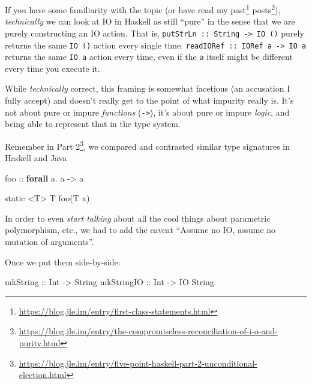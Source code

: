 \documentclass[]{article}
\newenvironment{Shaded}{}{}
\newcommand{\DataTypeTok}[1]{\textcolor[rgb]{0.56,0.13,0.00}{#1}}
\newcommand{\FunctionTok}[1]{\textcolor[rgb]{0.02,0.16,0.49}{#1}}
\newcommand{\KeywordTok}[1]{\textcolor[rgb]{0.00,0.44,0.13}{\textbf{#1}}}
\newcommand{\NormalTok}[1]{#1}
\newcommand{\OperatorTok}[1]{\textcolor[rgb]{0.40,0.40,0.40}{#1}}
\newcommand{\OtherTok}[1]{\textcolor[rgb]{0.00,0.44,0.13}{#1}}
\renewcommand{\href}[2]{#2\footnote{\url{#1}}}
\begin{document}
If you have some familiarity with the topic (or have read my
\href{https://blog.jle.im/entry/first-class-statements.html}{past}
\href{https://blog.jle.im/entry/the-compromiseless-reconciliation-of-i-o-and-purity.html}{posts}),
\emph{technically} we can look at IO in Haskell as still ``pure'' in the sense
that we are purely constructing an IO action. That is,
\texttt{putStrLn\ ::\ String\ -\textgreater{}\ IO\ ()} purely returns the same
\texttt{IO\ ()} action every single time.
\texttt{readIORef\ ::\ IORef\ a\ -\textgreater{}\ IO\ a} returns the same
\texttt{IO\ a} action every time, even if the \texttt{a} itself might be
different every time you execute it.

While \emph{technically} correct, this framing is somewhat facetious (an
accusation I fully accept) and doesn't really get to the point of what impurity
really is. It's not about pure or impure \emph{functions}
(\texttt{-\textgreater{}}), it's about pure or impure \emph{logic}, and being
able to represent that in the type system.

Remember in
\href{https://blog.jle.im/entry/five-point-haskell-part-2-unconditional-election.html}{Part
2}, we compared and contrasted similar type signatures in Haskell and Java

\begin{Shaded}
\begin{Highlighting}[]
\OtherTok{foo ::} \KeywordTok{forall}\NormalTok{ a}\OperatorTok{.}\NormalTok{ a }\OtherTok{{-}\textgreater{}}\NormalTok{ a}
\end{Highlighting}
\end{Shaded}

\begin{Shaded}
\begin{Highlighting}[]
\DataTypeTok{static} \OperatorTok{\textless{}}\NormalTok{T}\OperatorTok{\textgreater{}}\NormalTok{ T }\FunctionTok{foo}\OperatorTok{(}\NormalTok{T x}\OperatorTok{)}
\end{Highlighting}
\end{Shaded}

In order to even \emph{start talking} about all the cool things about parametric
polymorphism, etc., we had to add the caveat ``Assume no IO, assume no mutation
of arguments''.

Once we put them side-by-side:

\begin{Shaded}
\begin{Highlighting}[]
\OtherTok{mkString ::} \DataTypeTok{Int} \OtherTok{{-}\textgreater{}} \DataTypeTok{String}
\OtherTok{mkStringIO ::} \DataTypeTok{Int} \OtherTok{{-}\textgreater{}} \DataTypeTok{IO} \DataTypeTok{String}
\end{Highlighting}
\end{Shaded}
\end{document}
